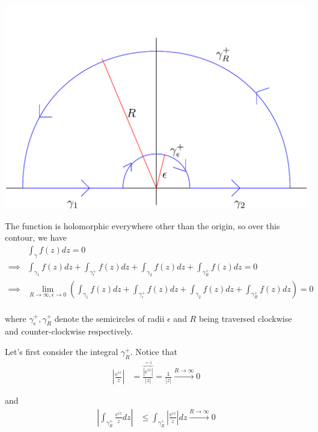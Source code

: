 \documentclass{article}
\begin{document}
\begin{center}
  \includegraphics*[scale=0.30]{Q5.png}
\end{center}

The function is holomorphic everywhere other than the origin, so over this contour, we have 
\begin{align*}
  &\int_{\gamma} f(z) dz = 0 \\
  \implies & \int_{{\gamma}_1} f(z) dz + \int_{{\gamma}_{\epsilon}^{+}} f(z) dz + \int_{{\gamma}_2} f(z) dz + \int_{{\gamma}_{R}^{+}} f(z) dz = 0 \\
  \implies & \lim_{R \rightarrow \infty, \epsilon \rightarrow 0} \left(\int_{{\gamma}_1} f(z) dz + \int_{{\gamma}_{\epsilon}^{+}} f(z) dz + \int_{{\gamma}_2} f(z) dz + \int_{{\gamma}_{R}^{+}} f(z) dz\right) = 0 \\
\end{align*}

where ${\gamma}_{\epsilon}^{+}, {\gamma}_{R}^{+}$ denote the semicircles of radii $\epsilon$ and $R$ being traversed clockwise and counter-clockwise respectively.

\vskip 0.5cm
Let's first consider the integral ${\gamma}_{R}^{+}$. Notice that 
\begin{align*}
  \left| \frac{e^{iz}}{z} \right| &= \frac{ \overbrace{\left| e^{iz} \right|}^{=1} }{\left| z \right|} = \frac{1}{\left|z\right|} \xrightarrow{R \rightarrow \infty} 0
\end{align*}

and 
\begin{align*}
  \left|\int_{{\gamma}_{R}^{+}} \frac{e^{iz}}{z} dz\right| &\leq \int_{{\gamma}_{R}^{+}} \left| \frac{e^{iz}}{z} \right| dz \xrightarrow{R \rightarrow \infty} 0
\end{align*}
\end{document}
